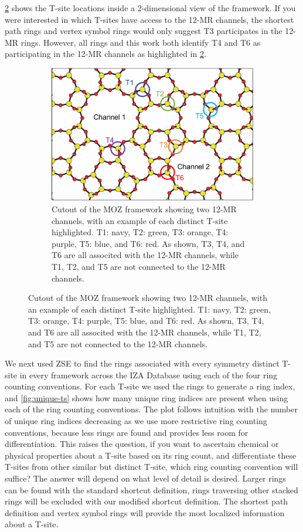 \documentclass[11pt]{article}
\begin{document}
\cref{fig:moz} shows the T-site locations inside a 2-dimensional view of the framework. If you were interested in which T-sites have access to the 12-MR channels, the shortest path rings and vertex symbol rings would only suggest T3 participates in the 12-MR rings. However, all rings and this work both identify T4 and T6 as participating in the 12-MR channels as highlighted in \cref{fig:moz}. 

\begin{figure}
\begin{figure}[H]
\centering
\includegraphics[width=\textwidth]{figures/chapter-3/moz.pdf}
\caption{Cutout of the MOZ framework showing two 12-MR channels, with an example of each distinct T-site highlighted. T1: navy, T2: green, T3: orange, T4: purple, T5: blue, and T6: red. As shown, T3, T4, and T6 are all associted with the 12-MR channels, while T1, T2, and T5 are not connected to the 12-MR channels. \label{fig:moz}}
\end{figure}
\end{figure}

We next used ZSE to find the rings associated with every symmetry distinct T-site in every framework across the IZA Database using each of the four ring counting conventions. For each T-site we used the rings to generate a ring index, and \cref{fig:unique-ts} shows how many unique ring indices are present when using each of the ring counting conventions. The plot follows intuition with the number of unique ring indices decreasing as we use more restrictive ring counting conventions, because less rings are found and provides less room for differentiation. This raises the question, if you want to ascertain chemical or physical properties about a T-site based on its ring count, and differentiate these T-sites from other similar but distinct T-site, which ring counting convention will suffice? The answer will depend on what level of detail is desired. Larger rings can be found with the standard shortcut definition, rings traversing other stacked rings will be excluded with our modified shortcut definition. The shortest path definition and vertex symbol rings will provide the most localized information about a T-site. 
\end{document}
